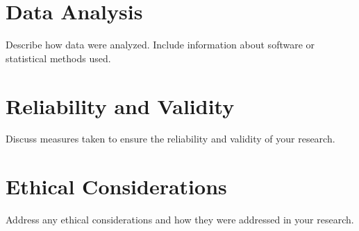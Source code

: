 \section{Data Analysis}

Describe how data were analyzed. Include information about software or statistical methods used.

\section{Reliability and Validity}

Discuss measures taken to ensure the reliability and validity of your research.

\section{Ethical Considerations}

Address any ethical considerations and how they were addressed in your research.

\newpage